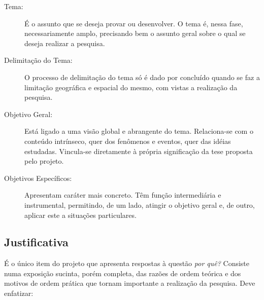 \documentclass[
	12pt,				%
    oneside,			%
	a4paper,			%
	english,			%
	french,				%
	spanish,			%
	brazil				%
	]{abntex2}
\begin{document}
\begin{description}
    \item[Tema:] É o assunto que se deseja provar ou
    desenvolver. O tema é, nessa fase, necessariamente amplo,
    precisando bem o assunto geral sobre o qual se deseja realizar
    a pesquisa.

    \item[Delimitação do Tema:] O processo de delimitação do tema
    só é dado por concluído quando se faz a limitação geográfica e
    espacial do mesmo, com vistas a realização da pesquisa.

    \item[Objetivo Geral:] Está ligado a uma visão global e
    abrangente do tema. Relaciona-se com o conteúdo intrínseco,
    quer dos fenômenos e eventos, quer das idéias estudadas.
    Vincula-se diretamente à própria significação da tese proposta
    pelo projeto.

    \item[Objetivos Específicos:] Apresentam caráter mais concreto.
    Têm função intermediária e instrumental, permitindo, de um
    lado, atingir o objetivo geral e, de outro, aplicar este a
    situações particulares.
\end{description}

\subsection{Justificativa}

É o único item do projeto que apresenta respostas à questão
\emph{por quê?} Consiste numa exposição sucinta, porém completa,
das razões de ordem teórica e dos motivos de ordem prática que
tornam importante a realização da pesquisa. Deve enfatizar:
\end{document}
